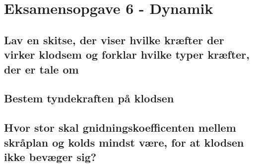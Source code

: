 \newpage
\section{Eksamensopgave 6 - Dynamik}
\subsection{Lav en skitse, der viser hvilke kræfter der virker klodsem og forklar hvilke typer kræfter, der er tale om}

\subsection{Bestem tyndekraften på klodsen}

\subsection{Hvor stor skal gnidningskoefficenten mellem skråplan og kolds mindst være, for at klodsen ikke bevæger sig?}